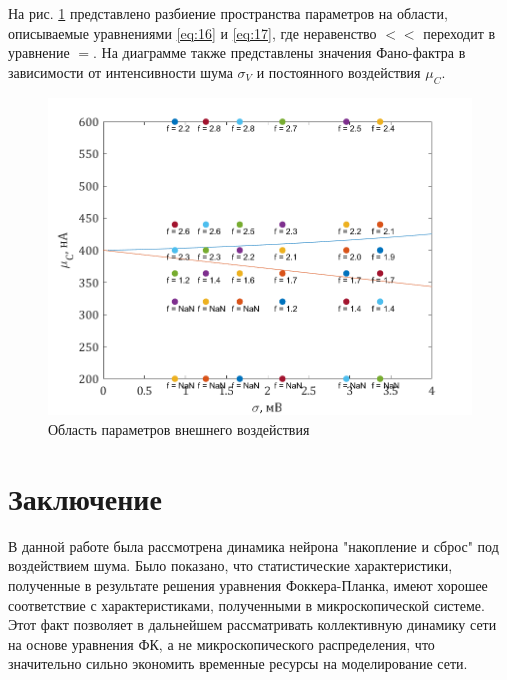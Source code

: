 На рис. \ref{pic:6} представлено разбиение пространства параметров на области, описываемые уравнениями \eqref{eq:16} и \eqref{eq:17}, где  неравенство $<<$ переходит в уравнение $=$. На диаграмме также представлены значения Фано-фактра в зависимости от интенсивности шума $\sigma_V$ и постоянного воздействия $\mu_C$.
\begin{figure}[H]
	\centering
	\includegraphics[width=0.8\linewidth]{pic/T_mean_T_sigma3.png}
	\caption{Область параметров внешнего воздействия}
	\label{pic:6}
\end{figure}
\section*{Заключение}
В данной работе была рассмотрена динамика нейрона "накопление и сброс" под воздействием шума. Было показано, что статистические характеристики, полученные в результате решения уравнения Фоккера-Планка, имеют хорошее соответствие с характеристиками, полученными в микроскопической системе. Этот факт позволяет в дальнейшем рассматривать коллективную динамику сети на основе уравнения ФК, а не микроскопического распределения, что значительно сильно экономить временные ресурсы на моделирование сети.
